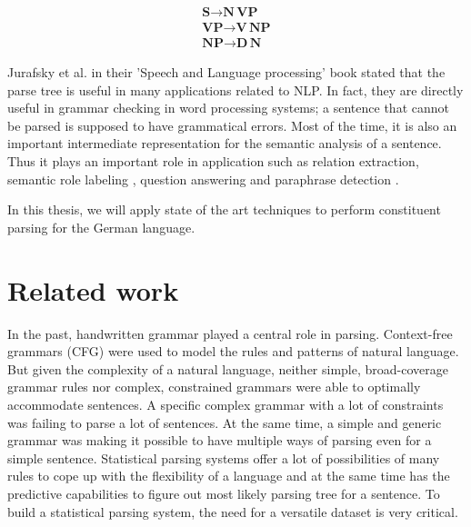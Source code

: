 \documentclass[a4paper, 11pt]{article}
\begin{document}
\begin{align*}
\textbf{S} \rightarrow \textbf{N} \, \textbf{VP} \\
\textbf{VP} \rightarrow \textbf{V} \, \textbf{NP} \\
\textbf{NP} \rightarrow \textbf{D} \, \textbf{N} 
\end{align*}

Jurafsky et al. \parencite{Jurafsky2008} in their 'Speech and Language processing' book stated that the parse tree is useful in many applications related to NLP. In fact, they are directly useful in grammar checking in word processing systems; a sentence that cannot be parsed is supposed to have grammatical errors. Most of the time, it is also an important intermediate representation for the semantic analysis of a sentence. Thus it plays an important role in application such as relation extraction, semantic role labeling \parencite{Gildea:2002:NPP:1073083.1073124}, question answering and paraphrase detection \parencite{Callison-Burch2010}.


In this thesis, we will apply state of the art techniques to perform constituent parsing for the German language.


\pagebreak
\section{Related work}

In the past, handwritten grammar played a central role in parsing. Context-free grammars (CFG) were used to model the rules and patterns of natural language. But given the complexity of a natural language, neither simple, broad-coverage grammar rules nor complex, constrained grammars were able to optimally accommodate sentences. A specific complex grammar with a lot of constraints was failing to parse a lot of sentences. At the same time, a simple and generic grammar was making it possible to have multiple ways of parsing even for a simple sentence. Statistical parsing systems offer a lot of possibilities of many rules to cope up with the flexibility of a language and at the same time has the predictive capabilities to figure out most likely parsing tree for a sentence. To build a statistical parsing system, the need for a versatile dataset is very critical. 
\end{document}
